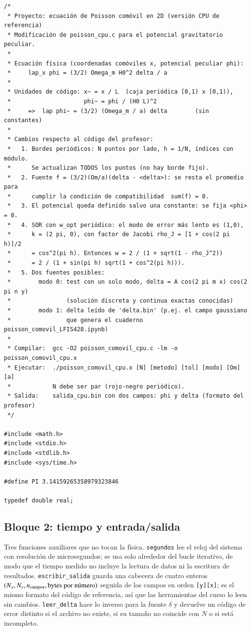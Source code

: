 \begin{appendix}
\begin{lstlisting}
/*
 * Proyecto: ecuación de Poisson comóvil en 2D (versión CPU de referencia)
 * Modificación de poisson_cpu.c para el potencial gravitatorio peculiar.
 *
 * Ecuación física (coordenadas comóviles x, potencial peculiar phi):
 *     lap_x phi = (3/2) Omega_m H0^2 delta / a
 *
 * Unidades de código: x~ = x / L  (caja periódica [0,1) x [0,1)),
 *                     phi~ = phi / (H0 L)^2
 *     =>  lap phi~ = (3/2) (Omega_m / a) delta        (sin constantes)
 *
 * Cambios respecto al código del profesor:
 *   1. Bordes periódicos: N puntos por lado, h = 1/N, índices con módulo.
 *      Se actualizan TODOS los puntos (no hay borde fijo).
 *   2. Fuente f = (3/2)(Om/a)(delta - <delta>): se resta el promedio para
 *      cumplir la condición de compatibilidad  sum(f) = 0.
 *   3. El potencial queda definido salvo una constante: se fija <phi> = 0.
 *   4. SOR con w_opt periódico: el modo de error más lento es (1,0),
 *      k = (2 pi, 0), con factor de Jacobi rho_J = [1 + cos(2 pi h)]/2
 *      = cos^2(pi h). Entonces w = 2 / (1 + sqrt(1 - rho_J^2))
 *      = 2 / (1 + sin(pi h) sqrt(1 + cos^2(pi h))).
 *   5. Dos fuentes posibles:
 *        modo 0: test con un solo modo, delta = A cos(2 pi m x) cos(2 pi n y)
 *                (solución discreta y continua exactas conocidas)
 *        modo 1: delta leído de 'delta.bin' (p.ej. el campo gaussiano
 *                que genera el cuaderno poisson_comovil_LFIS428.ipynb)
 *
 * Compilar:  gcc -O2 poisson_comovil_cpu.c -lm -o poisson_comovil_cpu.x
 * Ejecutar:  ./poisson_comovil_cpu.x [N] [metodo] [tol] [modo] [Om] [a]
 *            N debe ser par (rojo-negro periódico).
 * Salida:    salida_cpu.bin con dos campos: phi y delta (formato del profesor)
 */

#include <math.h>
#include <stdio.h>
#include <stdlib.h>
#include <sys/time.h>

#define PI 3.14159265358979323846

typedef double real;
\end{lstlisting}

\subsection{Bloque 2: tiempo y entrada/salida}

Tres funciones auxiliares que no tocan la física. \texttt{segundos} lee el reloj del sistema con resolución de microsegundos; se usa solo alrededor del bucle iterativo, de modo que el tiempo medido no incluye la lectura de datos ni la escritura de resultados. \texttt{escribir\_salida} guarda una cabecera de cuatro enteros $(N_x, N_y, n_{\rm campos}, \text{bytes por número})$ seguida de los campos en orden \texttt{[y][x]}; es el mismo formato del código de referencia, así que las herramientas del curso lo leen sin cambios. \texttt{leer\_delta} hace lo inverso para la fuente $\delta$ y devuelve un código de error distinto si el archivo no existe, si su tamaño no coincide con $N$ o si está incompleto.


\end{appendix}

